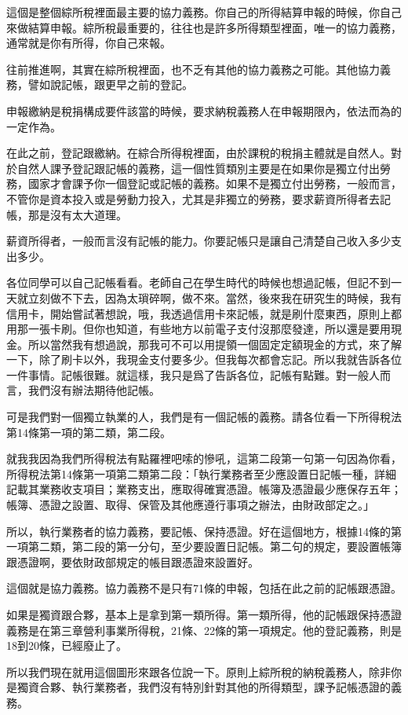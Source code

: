\documentclass[]{ctexbook}
\begin{document}
這個是整個綜所稅裡面最主要的協力義務。你自己的所得結算申報的時候，你自己來做結算申報。綜所稅最重要的，往往也是許多所得類型裡面，唯一的協力義務，通常就是你有所得，你自己來報。

往前推進啊，其實在綜所稅裡面，也不乏有其他的協力義務之可能。其他協力義務，譬如說記帳，跟更早之前的登記。

申報繳納是稅捐構成要件該當的時候，要求納稅義務人在申報期限內，依法而為的一定作為。

在此之前，登記跟繳納。在綜合所得稅裡面，由於課稅的稅捐主體就是自然人。對於自然人課予登記跟記帳的義務，這一個性質類別主要是在如果你是獨立付出勞務，國家才會課予你一個登記或記帳的義務。如果不是獨立付出勞務，一般而言，不管你是資本投入或是勞動力投入，尤其是非獨立的勞務，要求薪資所得者去記帳，那是沒有太大道理。

薪資所得者，一般而言沒有記帳的能力。你要記帳只是讓自己清楚自己收入多少支出多少。

各位同學可以自己記帳看看。老師自己在學生時代的時候也想過記帳，但記不到一天就立刻做不下去，因為太瑣碎啊，做不來。當然，後來我在研究生的時候，我有信用卡，開始嘗試著想說，哦，我透過信用卡來記帳，就是刷什麼東西，原則上都用那一張卡刷。但你也知道，有些地方以前電子支付沒那麼發達，所以還是要用現金。所以當然我有想過說，那我可不可以用提領一個固定定額現金的方式，來了解一下，除了刷卡以外，我現金支付要多少。但我每次都會忘記。所以我就告訴各位一件事情。記帳很難。就這樣，我只是爲了告訴各位，記帳有點難。對一般人而言，我們沒有辦法期待他記帳。

可是我們對一個獨立執業的人，我們是有一個記帳的義務。請各位看一下所得稅法第14條第一項的第二類，第二段。

就我我因為我們所得稅法有點羅裡吧嗦的慘吼，這第二段第一句第一句因為你看，所得稅法第14條第一項第二類第二段：「執行業務者至少應設置日記帳一種，詳細記載其業務收支項目；業務支出，應取得確實憑證。帳簿及憑證最少應保存五年；帳簿、憑證之設置、取得、保管及其他應遵行事項之辦法，由財政部定之。」

所以，執行業務者的協力義務，要記帳、保持憑證。好在這個地方，根據14條的第一項第二類，第二段的第一分句，至少要設置日記帳。第二句的規定，要設置帳簿跟憑證啊，要依財政部規定的帳目跟憑證來設置好。

這個就是協力義務。協力義務不是只有71條的申報，包括在此之前的記帳跟憑證。

如果是獨資跟合夥，基本上是拿到第一類所得。第一類所得，他的記帳跟保持憑證義務是在第三章營利事業所得稅，21條、22條的第一項規定。他的登記義務，則是18到20條，已經廢止了。

所以我們現在就用這個圖形來跟各位說一下。原則上綜所稅的納稅義務人，除非你是獨資合夥、執行業務者，我們沒有特別針對其他的所得類型，課予記帳憑證的義務。
\end{document}
